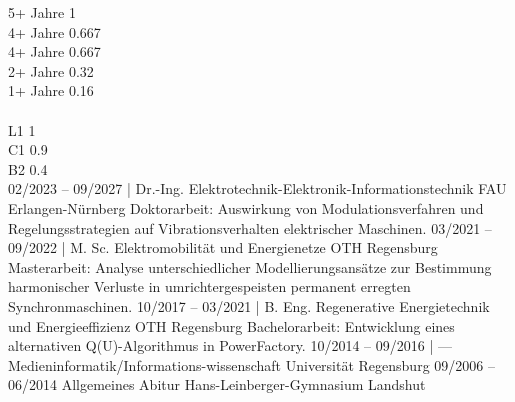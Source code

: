 
 {5+ Jahre} {1} \\[-2pt]

 {4+ Jahre} {0.667} \\[-2pt]

 {4+ Jahre} {0.667} \\[-2pt]

 {2+ Jahre} {0.32} \\[-2pt]

 {1+ Jahre} {0.16} \\[-2pt] \\

 {L1} {1} \\[-2pt]

 {C1} {0.9} \\[-2pt]

 {B2} {0.4} \\[-2pt]

\newpage
\cvmetaevent
{02/2023 -- 09/2027 | Dr.-Ing.}
{Elektrotechnik-Elektronik-Informationstechnik}
{FAU Erlangen-Nürnberg}
{Doktorarbeit: \glqq Auswirkung von Modulationsverfahren und Regelungsstrategien auf Vibrationsverhalten elektrischer Maschinen\grqq.}
\cvmetaevent
{03/2021 -- 09/2022 | M. Sc.}
{Elektromobilität und Energienetze}
{OTH Regensburg}
{Masterarbeit: \glqq Analyse unterschiedlicher Modellierungsansätze zur Bestimmung harmonischer Verluste in umrichtergespeisten permanent erregten Synchronmaschinen\grqq.}
\cvmetaevent
{10/2017 -- 03/2021 | B. Eng.}
{Regenerative Energietechnik und Energieeffizienz}
{OTH Regensburg}
{Bachelorarbeit: \glqq Entwicklung eines alternativen Q(U)-Algorithmus in PowerFactory\grqq.}
\cvmetaeventShort
{10/2014 -- 09/2016 | ---}
{Medieninformatik/Informations-\newline wissenschaft}
{Universität Regensburg}
\cvmetaeventShort
{09/2006 -- 06/2014}
{Allgemeines Abitur}
{Hans-Leinberger-Gymnasium Landshut}


\\[6pt]
\\[6pt]
\\[6pt]

